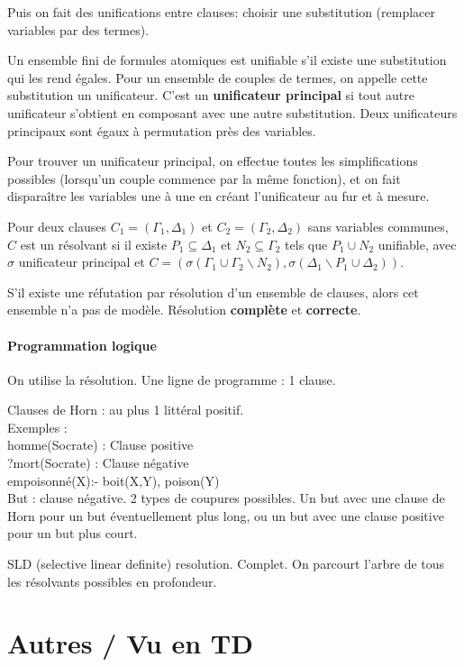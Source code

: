 \documentclass[french]{article}
\begin{document}
Puis on fait des unifications entre clauses:
choisir une substitution (remplacer variables par des termes).

Un ensemble fini de formules atomiques est unifiable s'il existe une substitution qui les rend égales. Pour un ensemble de couples de termes, on appelle cette substitution un unificateur. C'est un \textbf{unificateur principal} si tout autre unificateur s'obtient en composant avec une autre substitution. Deux unificateurs principaux sont égaux à permutation près des variables.

Pour trouver un unificateur principal, on effectue toutes les simplifications possibles (lorsqu'un couple commence par la même fonction), et on fait disparaître les variables une à une en créant l'unificateur au fur et à mesure.

Pour deux clauses $C_1 = (\Gamma_1, \Delta_1)$ et  $C_2 = (\Gamma_2, \Delta_2)$ sans variables communes, $C$ est un résolvant si il existe $P_1\subseteq\Delta_1$ et $N_2\subseteq\Gamma_2$ tels que $P_1\cup N_2$ unifiable, avec $\sigma$ unificateur principal et $C = (\sigma(\Gamma_1\cup\Gamma_2\backslash N_2), \sigma(\Delta_1\backslash P_1\cup\Delta_2))$.

S'il existe une réfutation par résolution d'un ensemble de clauses, alors cet ensemble n'a pas de modèle. Résolution \textbf{complète} et \textbf{correcte}.

\paragraph{Programmation logique}
On utilise la résolution. Une ligne de programme : 1 clause.

Clauses de Horn : au plus 1 littéral positif.\\
Exemples : \\
homme(Socrate) : Clause positive\\
?mort(Socrate) : Clause négative\\
empoisonné(X):- boit(X,Y), poison(Y)\\

But : clause négative. 2 types de coupures possibles. Un but avec une clause de Horn pour un but éventuellement plus long, ou un but avec une clause positive pour un but plus court.

SLD (selective linear definite) resolution. Complet. On parcourt l'arbre de tous les résolvants possibles en profondeur.

\section{Autres / Vu en TD}
\end{document}
